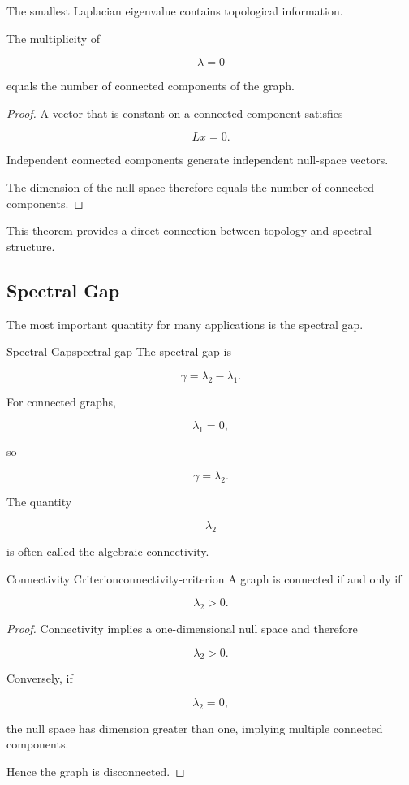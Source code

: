\documentclass[12pt,twoside,openright]{book}
\begin{document}
The smallest Laplacian eigenvalue contains topological
information.

\begin{theorem}
The multiplicity of

\[
\lambda=0
\]

equals the number of connected components of the graph.
\end{theorem}

\begin{proof}
A vector that is constant on a connected component
satisfies

\[
Lx=0.
\]

Independent connected components generate independent
null-space vectors.

The dimension of the null space therefore equals the
number of connected components.
\end{proof}

This theorem provides a direct connection between
topology and spectral structure.

\subsection{Spectral Gap}

The most important quantity for many applications is the
spectral gap.

\begin{definition}{Spectral Gap}{spectral-gap}
The spectral gap is

\[
\gamma
=

\lambda_2-\lambda_1.
\]
\end{definition}

For connected graphs,

\[
\lambda_1=0,
\]

so

\[
\gamma
=

\lambda_2.
\]

The quantity

\[
\lambda_2
\]

is often called the algebraic connectivity.

\begin{theorem}{Connectivity Criterion}{connectivity-criterion}
A graph is connected if and only if

\[
\lambda_2>0.
\]
\end{theorem}

\begin{proof}
Connectivity implies a one-dimensional null space and
therefore

\[
\lambda_2>0.
\]

Conversely, if

\[
\lambda_2=0,
\]

the null space has dimension greater than one, implying
multiple connected components.

Hence the graph is disconnected.
\end{proof}
\end{document}
